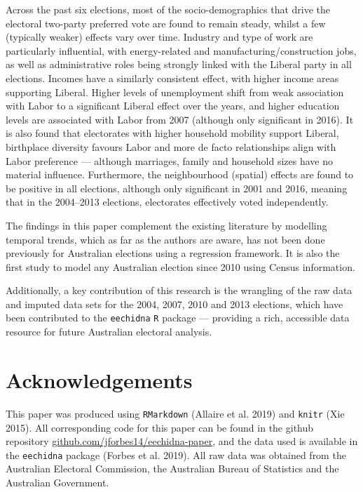 \documentclass[times, doublespace]{anzsauth}
\begin{document}
Across the past six elections, most of the socio-demographics that drive the electoral two-party preferred vote are found to remain steady, whilst a few (typically weaker) effects vary over time. Industry and type of work are particularly influential, with energy-related and manufacturing/construction jobs, as well as administrative roles being strongly linked with the Liberal party in all elections. Incomes have a similarly consistent effect, with higher income areas supporting Liberal. Higher levels of unemployment shift from weak association with Labor to a significant Liberal effect over the years, and higher education levels are associated with Labor from 2007 (although only significant in 2016). It is also found that electorates with higher household mobility support Liberal, birthplace diversity favours Labor and more de facto relationships align with Labor preference --- although marriages, family and household sizes have no material influence. Furthermore, the neighbourhood (spatial) effects are found to be positive in all elections, although only significant in 2001 and 2016, meaning that in the 2004--2013 elections, electorates effectively voted independently.

The findings in this paper complement the existing literature by modelling temporal trends, which as far as the authors are aware, has not been done previously for Australian elections using a regression framework. It is also the first study to model any Australian election since 2010 using Census information.

Additionally, a key contribution of this research is the wrangling of the raw data and imputed data sets for the 2004, 2007, 2010 and 2013 elections, which have been contributed to the \texttt{eechidna} \texttt{R} package --- providing a rich, accessible data resource for future Australian electoral analysis.

\hypertarget{acknowledgements}{%
\section{Acknowledgements}\label{acknowledgements}}

This paper was produced using \texttt{RMarkdown} (Allaire et al. 2019) and \texttt{knitr} (Xie 2015). All corresponding code for this paper can be found in the github repository \href{https://github.com/jforbes14/eechidna-paper}{github.com/jforbes14/eechidna-paper}, and the data used is available in the \texttt{eechidna} package (Forbes et al. 2019). All raw data was obtained from the Australian Electoral Commission, the Australian Bureau of Statistics and the Australian Government.
\end{document}
